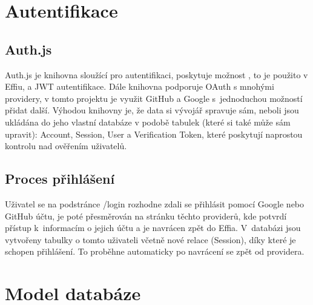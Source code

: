 \documentclass[12pt, a4paper,
openright
]{report}
\begin{document}
\section{Autentifikace}
\subsection{Auth.js}
Auth.js je knihovna sloužící pro autentifikaci, poskytuje možnost , to je použito v Effiu, a JWT autentifikace. Dále knihovna podporuje OAuth s mnohými providery, v tomto projektu je využit GitHub a Google s~jednoduchou možností přidat další. Výhodou knihovny je, že data si vývojář spravuje sám, neboli jsou ukládána do jeho vlastní databáze v podobě tabulek (které si také může sám upravit): Account, Session, User a Verification Token, které poskytují naprostou kontrolu nad ověřením uživatelů.

\subsection{Proces přihlášení}
Uživatel se na podstránce /login rozhodne zdali se přihlásit pomocí Google nebo GitHub účtu, je poté přesměrován na stránku těchto providerů, kde potvrdí přístup k~informacím o jejich účtu a je navrácen zpět do Effia. V~databázi jsou vytvořeny tabulky o tomto uživateli včetně nové relace (Session), díky které je schopen přihlášení. To proběhne automaticky po navrácení se zpět od providera.

\clearpage
\section{Model databáze}
\end{document}
